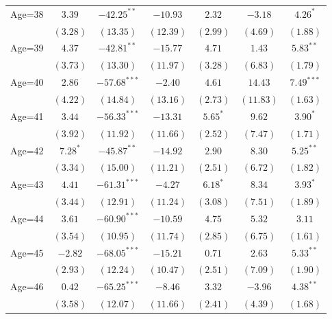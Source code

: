 \documentclass[fullpage]{paper}
\begin{document}
\begin{center}
\begin{longtable}{l c c c c c c }
Age=38      & $3.39$       & $-42.25^{**}$  & $-10.93$      & $2.32$       & $-3.18$       & $4.26^{*}$    \\
            & $(3.28)$     & $(13.35)$      & $(12.39)$     & $(2.99)$     & $(4.69)$      & $(1.88)$      \\
Age=39      & $4.37$       & $-42.81^{**}$  & $-15.77$      & $4.71$       & $1.43$        & $5.83^{**}$   \\
            & $(3.73)$     & $(13.30)$      & $(11.97)$     & $(3.28)$     & $(6.83)$      & $(1.79)$      \\
Age=40      & $2.86$       & $-57.68^{***}$ & $-2.40$       & $4.61$       & $14.43$       & $7.49^{***}$  \\
            & $(4.22)$     & $(14.84)$      & $(13.16)$     & $(2.73)$     & $(11.83)$     & $(1.63)$      \\
Age=41      & $3.44$       & $-56.33^{***}$ & $-13.31$      & $5.65^{*}$   & $9.62$        & $3.90^{*}$    \\
            & $(3.92)$     & $(11.92)$      & $(11.66)$     & $(2.52)$     & $(7.47)$      & $(1.71)$      \\
Age=42      & $7.28^{*}$   & $-45.87^{**}$  & $-14.92$      & $2.90$       & $8.30$        & $5.25^{**}$   \\
            & $(3.34)$     & $(15.00)$      & $(11.21)$     & $(2.51)$     & $(6.72)$      & $(1.82)$      \\
Age=43      & $4.41$       & $-61.31^{***}$ & $-4.27$       & $6.18^{*}$   & $8.34$        & $3.93^{*}$    \\
            & $(3.44)$     & $(12.91)$      & $(11.24)$     & $(3.08)$     & $(7.51)$      & $(1.89)$      \\
Age=44      & $3.61$       & $-60.90^{***}$ & $-10.59$      & $4.75$       & $5.32$        & $3.11$        \\
            & $(3.54)$     & $(10.95)$      & $(11.74)$     & $(2.85)$     & $(6.75)$      & $(1.61)$      \\
Age=45      & $-2.82$      & $-68.05^{***}$ & $-15.21$      & $0.71$       & $2.63$        & $5.33^{**}$   \\
            & $(2.93)$     & $(12.24)$      & $(10.47)$     & $(2.51)$     & $(7.09)$      & $(1.90)$      \\
Age=46      & $0.42$       & $-65.25^{***}$ & $-8.46$       & $3.32$       & $-3.96$       & $4.38^{**}$   \\
            & $(3.58)$     & $(12.07)$      & $(11.66)$     & $(2.41)$     & $(4.39)$      & $(1.68)$      \\

\end{longtable}
\end{center}
\end{document}
